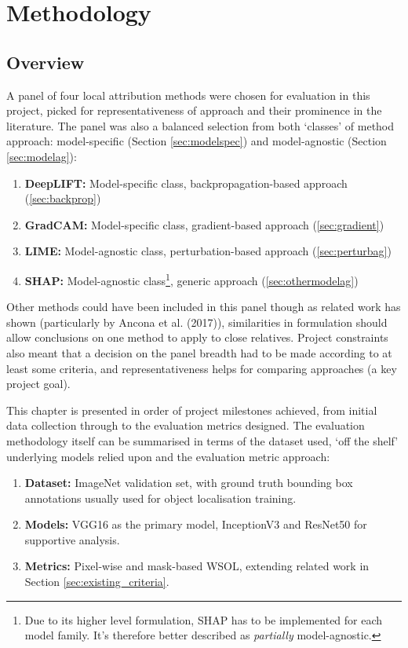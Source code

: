 \documentclass[main]{subfiles}
\begin{document}
\chapter{Methodology}

\section{Overview}

A panel of four local attribution methods were chosen for evaluation in this project, picked for representativeness of approach and their prominence in the literature. The panel was also a balanced selection from both `classes' of method approach: model-specific (Section \ref{sec:modelspec}) and model-agnostic (Section \ref{sec:modelag}):

\begin{enumerate}

\item \textbf{DeepLIFT:} Model-specific class, backpropagation-based approach (\ref{sec:backprop})
\item \textbf{GradCAM:} Model-specific class, gradient-based approach (\ref{sec:gradient})
\item \textbf{LIME:} Model-agnostic class, perturbation-based approach (\ref{sec:perturbag})
\item \textbf{SHAP:} Model-agnostic class\footnote{Due to its higher level formulation, SHAP has to be implemented for each model family. It's therefore better described as \textit{partially} model-agnostic.}, generic approach (\ref{sec:othermodelag})

\end{enumerate}

Other methods could have been included in this panel though as related work has shown (particularly by Ancona et al. (2017)), similarities in formulation should allow conclusions on one method to apply to close relatives. Project constraints also meant that a decision on the panel breadth had to be made according to at least some criteria, and representativeness helps for comparing approaches (a key project goal).

This chapter is presented in order of project milestones achieved, from initial data collection through to the evaluation metrics designed. The evaluation methodology itself can be summarised in terms of the dataset used, `off the shelf' underlying models relied upon and the evaluation metric approach:
\newpage

\begin{enumerate}
\item \textbf{Dataset:} ImageNet validation set, with ground truth bounding box annotations usually used for object localisation training. 
\item \textbf{Models:} VGG16 as the primary model, InceptionV3 and ResNet50 for supportive analysis.
\item \textbf{Metrics:} Pixel-wise and mask-based WSOL, extending related work in Section \ref{sec:existing_criteria}.
\end{enumerate}
\end{document}
